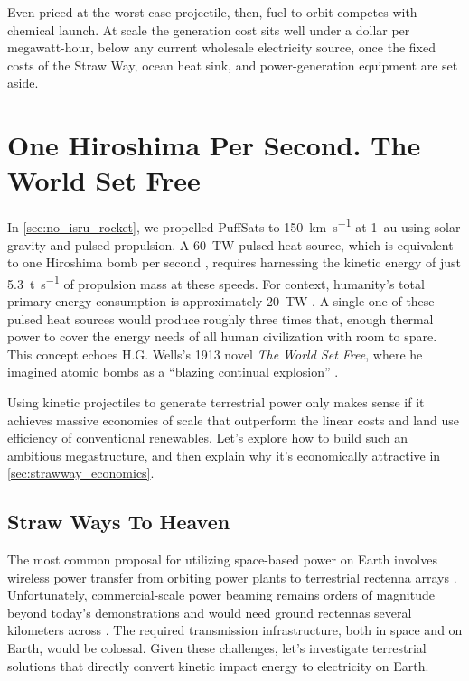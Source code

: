 \documentclass{article}
\begin{document}
Even priced at the worst-case projectile, then, fuel to orbit competes with chemical launch. At scale the generation cost sits well under a dollar per megawatt-hour, below any current wholesale electricity source, once the fixed costs of the Straw Way, ocean heat sink, and power-generation equipment are set aside.

\section{One Hiroshima Per Second. The World Set Free}\label{sec:world_set_free}
In \autoref{sec:no_isru_rocket}, we propelled PuffSats to \SI{150}{\kilo\meter\per\second} at \SI{1}{\astronomicalunit} using solar gravity and pulsed propulsion. A \SI{60}{\tera\watt} pulsed heat source, which is equivalent to one Hiroshima bomb per second \cite{hiroshima}, requires harnessing the kinetic energy of just \SI{5.3}{\tonne\per\second} of propulsion mass at these speeds. For context, humanity's total primary-energy consumption is approximately \SI{20}{\tera\watt} \cite{owid-energy-production-consumption}. A single one of these pulsed heat sources would produce roughly three times that, enough thermal power to cover the energy needs of all human civilization with room to spare.  This concept echoes H.G. Wells's 1913 novel \textit{The World Set Free}, where he imagined atomic bombs as a ``blazing continual explosion'' \cite{wells1914world}.  

Using kinetic projectiles to generate terrestrial power only makes sense if it achieves massive economies of scale that outperform the linear costs and land use efficiency of conventional renewables.  Let's explore how to build such an ambitious megastructure, and then explain why it's economically attractive in \autoref{sec:strawway_economics}.     

\subsection{Straw Ways To Heaven}\label{sec:straw_way_to_heaven}
The most common proposal for utilizing space-based power on Earth involves wireless power transfer from orbiting power plants to terrestrial rectenna arrays \cite{malaviya2022comprehensive}.  Unfortunately, commercial-scale power beaming remains orders of magnitude beyond today's demonstrations and would need ground rectennas several kilometers across \cite{space_beaming_power}. The required transmission infrastructure, both in space and on Earth, would be colossal.  Given these challenges, let's investigate terrestrial solutions that directly convert kinetic impact energy to electricity on Earth.
\end{document}
